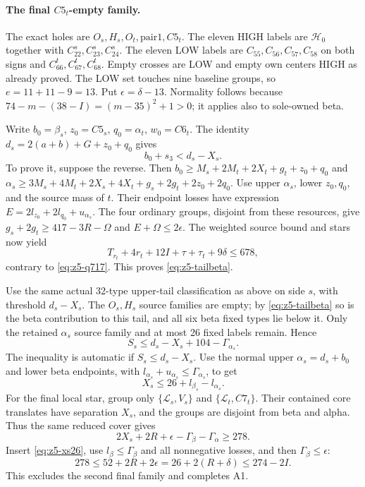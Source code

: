 \documentclass[11pt,letterpaper]{article}
\theoremstyle{definition}\newtheorem{definition}[theorem]{Definition}
\begin{document}
\paragraph{The final $C5_t$-empty family.}
The exact holes are $O_s,H_s,O_t,\mathrm{pair1},C5_t$.
The eleven HIGH labels are $\mathcal H_0$ together with
$C_{22}^s,C_{23}^s,C_{24}^s$.
The eleven LOW labels are $C_{55},C_{56},C_{57},C_{58}$ on both
signs and $C_{66}^t,C_{67}^t,C_{68}^t$.
Empty crosses are LOW and empty own centers HIGH as already proved.
The LOW set touches nine baseline groups, so $e=11+11-9=13$.
Put $\epsilon=\delta-13$. Normality follows because
$74-m-(38-I)=(m-35)^2+1>0$; it applies also to sole-owned beta.

Write $b_0=\beta_s$, $z_0=C5_s$, $q_0=\alpha_t$, $w_0=C6_t$.
The identity $d_s=2(a+b)+G+z_0+q_0$ gives
\begin{equation}\label{eq:z5-tailbeta}
 b_0+s_3<d_s-X_s.
\end{equation}
To prove it, suppose the reverse. Then
$b_0\ge M_s+2M_t+2X_t+g_t+z_0+q_0$ and
$\alpha_s\ge3M_s+4M_t+2X_s+4X_t+g_s+2g_t+2z_0+2q_0$.
Use upper $\alpha_s$, lower $z_0,q_0$, and the source mass of $t$.
Their endpoint losses have expression $E=2l_{z_0}+2l_{q_0}+u_{\alpha_s}$.
The four ordinary groups, disjoint from these resources, give
$g_s+2g_t\ge417-3R-\Omega$ and $E+\Omega\le2\epsilon$.
The weighted source bound and stars now yield
\[
 T_{r_t}+4r_t+12I+\tau+\tau_t+9\delta\le678,
\]
contrary to \eqref{eq:z5-q717}. This proves \eqref{eq:z5-tailbeta}.

Use the same actual 32-type upper-tail classification as above on side
$s$, with threshold $d_s-X_s$. The $O_s,H_s$ source families are
empty; by \eqref{eq:z5-tailbeta} so is the beta contribution to this
tail, and all six beta fixed types lie below it. Only the retained
$\alpha_s$ source family and at most 26 fixed labels remain. Hence
\[
 S_s\le d_s-X_s+104-\Gamma_{\alpha_s}.
\]
The inequality is automatic if $S_s\le d_s-X_s$.
Use the normal upper $\alpha_s=d_s+b_0$ and lower beta endpoints,
with $l_{\alpha_s}+u_{\alpha_s}\le\Gamma_{\alpha_s}$, to get
\begin{equation}\label{eq:z5-xs26}
 X_s\le26+l_{\beta_s}-l_{\alpha_s}.
\end{equation}
For the final local star, group only
$\{\mathcal L_s,V_s\}$ and $\{\mathcal L_t,C7_t\}$.
Their contained core translates have separation $X_s$, and the groups
are disjoint from beta and alpha. Thus the same reduced cover gives
\[
 2X_s+2R+\epsilon-\Gamma_\beta-\Gamma_\alpha\ge278.
\]
Insert \eqref{eq:z5-xs26}, use $l_\beta\le\Gamma_\beta$ and all
nonnegative losses, and then $\Gamma_\beta\le\epsilon$:
\[
 278\le52+2R+2\epsilon
       =26+2(R+\delta)\le274-2I.
\]
This excludes the second final family and completes A1.
\end{document}
